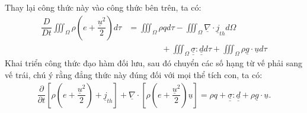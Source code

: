 \documentclass[../../../main.tex]{subfiles}
\begin{document}
    Thay lại công thức này vào công thức bên trên, ta có:
        \[
            \begin{aligned}
                \dfrac{D}{Dt}\iiint_{\Omega}\rho\left(e+\dfrac{\underline{u}^2}{2}\right)d\tau&=\iiint_{\Omega}\rho qd\tau-\iiint_{\Omega}\underline{\nabla}\cdot\underline{j}_{th}d\Omega\\
                &\qquad\qquad+\iiint_{\Omega}\underline{\underline{\sigma}}\colon\underline{\underline{d}}d\tau+\iiint_{\Omega}\rho\underline{g}\cdot\underline{u}d\tau
            \end{aligned}
        \]
    Khai triển công thức đạo hàm đối lưu, sau đó chuyển các số hạng từ vế phải sang vế trái, chú ý rằng đẳng thức này đúng đối với mọi thể tích con, ta có:
        \begin{align}
            \boxed{\dfrac{\partial}{\partial t}\left[\rho\left(e+\dfrac{\underline{u}^2}{2}\right)+\underline{j}_{th}\right]+\underline{\nabla}\cdot\left[\rho\left(e+\dfrac{\underline{u}^2}{2}\right)\underline{u}\right]=\rho q+\underline{\underline{\sigma}}:\underline{\underline{d}}+\rho\underline{g}\cdot\underline{u}}.
        \end{align}

\end{document}
